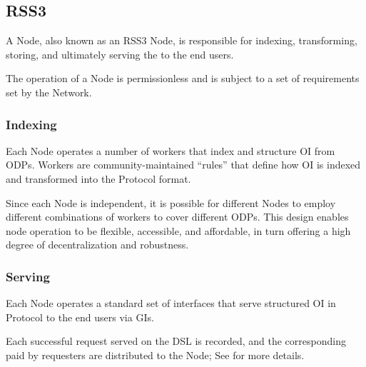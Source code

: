 \subsection{RSS3 }
\label{subsec:Node}

A \gls{Node}, also known as an RSS3 Node, is responsible for indexing, transforming, storing, and ultimately serving the  to the end users.

The operation of a \gls{Node} is permissionless and is subject to a set of requirements set by the Network.

\subsubsection{Indexing}
Each \gls{Node} operates a number of workers that index and structure \gls{OI} from \glspl{ODP}.
Workers are community-maintained ``rules'' that define how \gls{OI} is indexed and transformed into the \gls{Protocol} format.

Since each \gls{Node} is independent, it is possible for different \glspl{Node} to employ different combinations of workers to cover different \glspl{ODP}.
This design enables node operation to be flexible, accessible, and affordable, in turn offering a high degree of decentralization and robustness.

\subsubsection{Serving}
Each \gls{Node} operates a standard set of interfaces that serve structured \gls{OI} in \gls{Protocol} to the end users via \glspl{GI}.

Each successful request served on the \gls{DSL} is recorded, and the corresponding  paid by requesters are distributed to the \gls{Node};
See  for more details.
